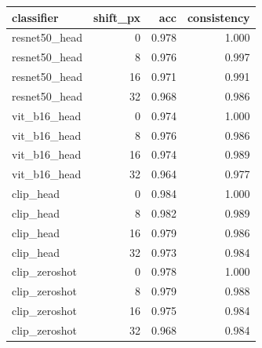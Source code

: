 \begin{tabular}{lrrr}
\toprule
classifier & shift_px & acc & consistency \\
\midrule
resnet50_head & 0 & 0.978 & 1.000 \\
resnet50_head & 8 & 0.976 & 0.997 \\
resnet50_head & 16 & 0.971 & 0.991 \\
resnet50_head & 32 & 0.968 & 0.986 \\
vit_b16_head & 0 & 0.974 & 1.000 \\
vit_b16_head & 8 & 0.976 & 0.986 \\
vit_b16_head & 16 & 0.974 & 0.989 \\
vit_b16_head & 32 & 0.964 & 0.977 \\
clip_head & 0 & 0.984 & 1.000 \\
clip_head & 8 & 0.982 & 0.989 \\
clip_head & 16 & 0.979 & 0.986 \\
clip_head & 32 & 0.973 & 0.984 \\
clip_zeroshot & 0 & 0.978 & 1.000 \\
clip_zeroshot & 8 & 0.979 & 0.988 \\
clip_zeroshot & 16 & 0.975 & 0.984 \\
clip_zeroshot & 32 & 0.968 & 0.984 \\
\bottomrule
\end{tabular}
